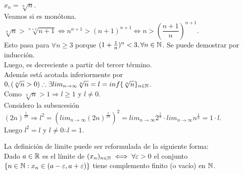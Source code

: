 \begin{eg}
  \(x_n = \sqrt[n]{n}\). \\
  Veamos si es monótona. \(\sqrt[n]{n} > \sqrt[n+1]{n+1} \iff n^{n+1} > (n+1)^{n+1} \iff n > (\dfrac{n+1}{n})^{n+1}\). \\
  Esto pasa para \(\forall n \geq 3\) porque \((1+\frac{1}{n})^n < 3, \forall n \in \mathbb{N}\). Se puede demostrar por inducción. \\
  Luego, es decreciente a partir del tercer término. \\
  Además está acotada inferiormente por \(0, (\sqrt[n]{n} > 0) \therefore \exists lim_{n \to \infty} \sqrt[n]{n} = l = inf\{ \sqrt[n]{n} \}_{n \in \mathbb{N}}\). \\
  Como \(\sqrt[n]{n} > 1 \Rightarrow l \geq 1\) y \(l \neq 0\). \\
  Considero la subsucesión \((2n)^{\frac{1}{2n}} \Rightarrow l^2 = (lim_{n \to \infty} (2n)^{\frac{1}{2n}})^2 = lim_{n \to \infty} 2^{\frac{1}{n}} \cdot lim_{n \to \infty} n^{\frac{1}{n}} = 1 \cdot l\). \\
  Luego \(l^2 = l\) y \(l \neq 0 \therefore l = 1\).
\end{eg}

\begin{note}
  La definición de límite puede ser reformulada de la siguiente forma: \\
  Dado \(a \in \mathbb{R}\) es el límite de \((x_n)_{n \in \mathbb{N}} \iff \forall \varepsilon > 0\) el conjunto \(\{ n \in \mathbb{N} : x_n \in (a - \varepsilon, a + \varepsilon) \}\) tiene complemento finito (o vacío) en \(\mathbb{N}\).
\end{note}

